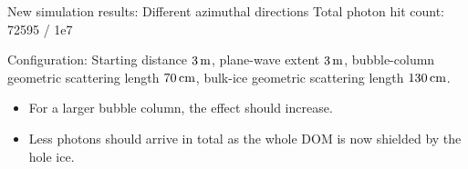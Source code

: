 \begin{frame}[fragile]{New simulation results: Different azimuthal directions}
  \tiny Total photon hit count: 72595 / 1e7

  \tiny Configuration: Starting distance $3\text{\,m}$, plane-wave extent $3\text{\,m}$, bubble-column geometric scattering length $70\text{\,cm}$, bulk-ice geometric scattering length $130\text{\,cm}$.
  \normalsize

  \begin{itemize}
    \item For a larger bubble column, the effect should increase. \checkmark
    \item Less photons should arrive in total \tiny as the whole DOM is now shielded by the hole ice. \normalsize \checkmark
  \end{itemize}
\end{frame}

%
%
%
%
